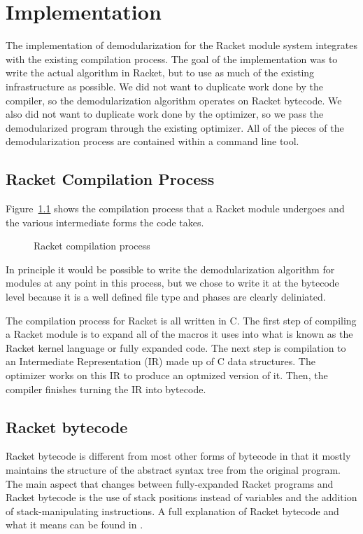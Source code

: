 \chapter{Implementation}
\label{chap:implementation}

The implementation of demodularization for the Racket module system integrates with the existing compilation process. 
The goal of the implementation was to write the actual algorithm in Racket, but to use as much of the existing infrastructure as possible. 
We did not want to duplicate work done by the compiler, so the demodularization algorithm operates on Racket bytecode. 
We also did not want to duplicate work done by the optimizer, so we pass the demodularized program through the existing optimizer.
All of the pieces of the demodularization process are contained within a command line tool. 

\section{Racket Compilation Process}

Figure~\ref{fig:compilation} shows the compilation process that a Racket module undergoes and the various intermediate forms the code takes.
\begin{figure}
  
  \label{fig:compilation}
  \caption{Racket compilation process}
\end{figure}
In principle it would be possible to write the demodularization algorithm for modules at any point in this process, but we chose to write it at the bytecode level because it is a well defined file type and phases are clearly deliniated.

The compilation process for Racket is all written in C.
The first step of compiling a Racket module is to expand all of the macros it uses into what is known as the Racket kernel language or fully expanded code.
The next step is compilation to an Intermediate Representation (IR) made up of C data structures.
The optimizer works on this IR to produce an optmized version of it.
Then, the compiler finishes turning the IR into bytecode.

\section{Racket bytecode}
Racket bytecode is different from most other forms of bytecode in that it mostly maintains the structure of the abstract syntax tree from the original program.
The main aspect that changes between fully-expanded Racket programs and Racket bytecode is the use of stack positions instead of variables and the addition of stack-manipulating instructions.
A full explanation of Racket bytecode and what it means can be found in \cite{bytecode}.

